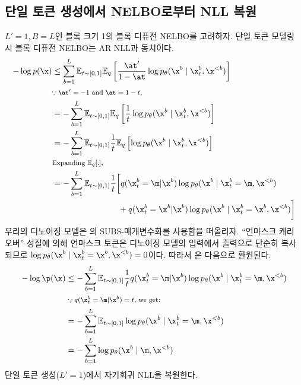 \documentclass{article} %
\begin{document}
\subsection{단일 토큰 생성에서 NELBO로부터 NLL 복원} \label{supp:sar-block1-nll}
$L'=1, B=L$인 블록 크기 1의 블록 디퓨전 NELBO를 고려하자. 단일 토큰 모델링 시 블록 디퓨전 NELBO는 AR NLL과 동치이다.
\begin{align}\label{eqn:supp:true-nll-part1}
    -\log p(\x) & \leq \sum_{b=1}^{L} \mathbb{E}_{t \sim [0, 1]} \mathbb{E}_{q} \left[ \frac{\at'}{1-\at} \log  p_\theta(\x^b \mid \x_t^b ,\x^{<b}) \right] \nonumber \\
    & \text{\footnotesize{$\because \at' = -1$ and $\at = 1-t$},} \nonumber \\ 
    &= -\sum_{b=1}^{L} \mathbb{E}_{t \sim [0, 1]} \mathbb{E}_{q} \left[ \frac{1}{t} \log p_\theta(\x^b \mid \x_t^b,\x^{<b})  \right] \nonumber \\
    &= -\sum_{b=1}^{L} \mathbb{E}_{t \sim [0, 1]}  \frac{1}{t} \mathbb{E}_{q} \left[ \log p_\theta(\x^b \mid \x_t^b,\x^{<b})  \right] \nonumber \\
    & \text{\footnotesize Expanding $\mathbb{E}_q[.]$,} \nonumber \\
    &= - \sum_{b=1}^{L} \mathbb{E}_{t \sim [0, 1]} \frac{1}{t} \bigg[ q(\x_t^b = \m | \x^b )\log p_\theta(\x^b \mid \x_t^b = \m,\x^{<b}) \nonumber \\
    &\hspace{8em} + q(\x_t^b = \x^b | \x^b ) \log p_\theta(\x^b \mid \x_t^b = \x^b,\x^{<b}) \bigg]
\end{align}
우리의 디노이징 모델은 \citet{sahoo2024diffusion}의 SUBS-매개변수화를 사용함을 떠올리자. ``언마스크 캐리 오버'' 성질에 의해 언마스크 토큰은 디노이징 모델의 입력에서 출력으로 단순히 복사되므로 $\log p_\theta(\x^b \mid \x_t^b = \x^b, \x^{<b})=0$이다. 따라서 은 다음으로 환원된다.
\begin{align}
    -\log \p(\x) &\leq - \sum_{b=1}^{L} \mathbb{E}_{t \sim [0, 1]} \frac{1}{t} q(\x_t^b = \m | \x^b) \log p_\theta(\x^b \mid \x_t^b = \m,\x^{<b})  \nonumber \\
    & \text{\footnotesize{ $\because q(\x^b_t = \m | \x^b) = t$, we get:}} \nonumber \\
    &= - \sum_{b=1}^{L} \mathbb{E}_{t \sim [0, 1]} \log p_\theta(\x^b \mid \x_t^b = \m,\x^{<b}) \nonumber \\
    &= - \sum_{b=1}^{L} \log p_\theta(\x^b \mid \m, \x^{<b})
\end{align}
단일 토큰 생성($L'=1$)에서 자기회귀 NLL을 복원한다.
\end{document}

